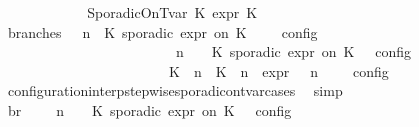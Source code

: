 \begin{isabellebody}
\ \ \ \ \isamarkupfalse%
\isanewline
\ \ \ \ \ \ \isamarkupfalse%
\ {\isacharparenleft}SporadicOnTvar\ K\ {\isasymtau}\isactrlsub e\isactrlsub x\isactrlsub p\isactrlsub r\ K\isanewline
\ \ \ \ \ \ \ \ \isamarkupfalse%
\ branches{\isacharcolon}\ {\isacartoucheopen}{\isasymlbrakk}\ {\isasymGamma}{\isacharcomma}\ n\ {\isasymturnstile}\ {\isacharparenleft}{\isacharparenleft}K\ sporadic{\isasymsharp}\ {\isasymtau}\isactrlsub e\isactrlsub x\isactrlsub p\isactrlsub r\ on\ K\ {\isacharhash}\ {\isasymPsi}{\isacharparenright}\ {\isasymtriangleright}\ {\isasymPhi}\ {\isasymrbrakk}\isactrlsub c\isactrlsub o\isactrlsub n\isactrlsub f\isactrlsub i\isactrlsub g\isanewline
\ \ \ \ \ \ \ \ \ \ \ \ \ \ \ \ \ \ \ \ \ \ {\isacharequal}\ {\isasymlbrakk}\ {\isasymGamma}{\isacharcomma}\ n\ {\isasymturnstile}\ {\isasymPsi}\ {\isasymtriangleright}\ {\isacharparenleft}{\isacharparenleft}K\ sporadic{\isasymsharp}\ {\isasymtau}\isactrlsub e\isactrlsub x\isactrlsub p\isactrlsub r\ on\ K\ {\isacharhash}\ {\isasymPhi}{\isacharparenright}\ {\isasymrbrakk}\isactrlsub c\isactrlsub o\isactrlsub n\isactrlsub f\isactrlsub i\isactrlsub g\isanewline
\ \ \ \ \ \ \ \ \ \ \ \ \ \ \ \ \ \ \ \ \ \ {\isasymunion}\ {\isasymlbrakk}\ {\isacharparenleft}{\isacharparenleft}K\ {\isasymUp}\ n{\isacharparenright}\ {\isacharhash}\ {\isacharparenleft}K\ {\isasymDown}\ n\ {\isacharat}{\isasymsharp}\ {\isasymtau}\isactrlsub e\isactrlsub x\isactrlsub p\isactrlsub r{\isacharparenright}\ {\isacharhash}\ {\isasymGamma}{\isacharparenright}{\isacharcomma}\ n\ {\isasymturnstile}\ {\isasymPsi}\ {\isasymtriangleright}\ {\isasymPhi}\ {\isasymrbrakk}\isactrlsub c\isactrlsub o\isactrlsub n\isactrlsub f\isactrlsub i\isactrlsub g{\isacartoucheclose}\isanewline
\ \ \ \ \ \ \ \ \ \ \isamarkupfalse%
\ configuration{\isacharunderscore}interp{\isacharunderscore}stepwise{\isacharunderscore}sporadicon{\isacharunderscore}tvar{\isacharunderscore}cases\ \isamarkupfalse%
\ simp\isanewline
\ \ \ \ \ \ \ \ \isamarkupfalse%
\ br{}{\isacharcolon}\ {\isacartoucheopen}{\isasymrho}\ {\isasymin}\ {\isasymlbrakk}\ {\isasymGamma}{\isacharcomma}\ n\ {\isasymturnstile}\ {\isasymPsi}\ {\isasymtriangleright}\ {\isacharparenleft}{\isacharparenleft}K\ sporadic{\isasymsharp}\ {\isasymtau}\isactrlsub e\isactrlsub x\isactrlsub p\isactrlsub r\ on\ K\ {\isacharhash}\ {\isasymPhi}{\isacharparenright}\ {\isasymrbrakk}\isactrlsub c\isactrlsub o\isactrlsub n\isactrlsub f\isactrlsub i\isactrlsub g\isanewline

\end{isabellebody}
